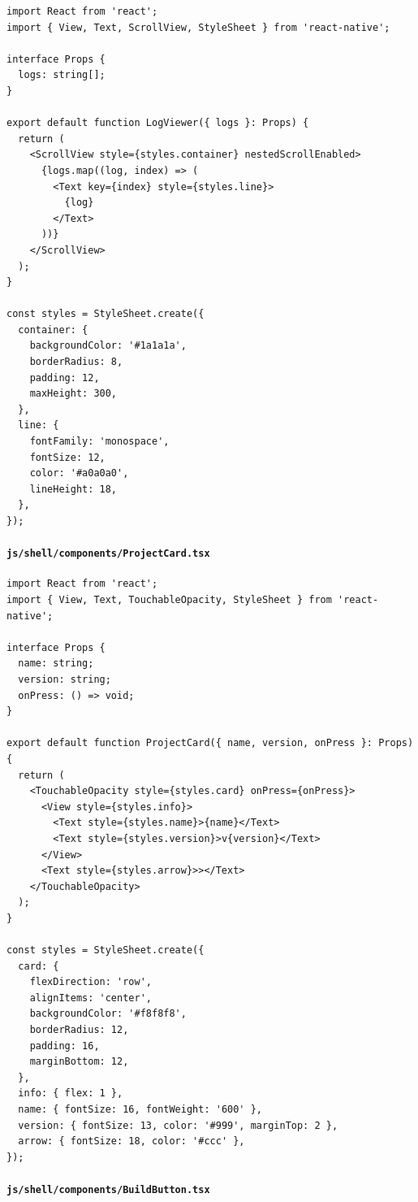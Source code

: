 \documentclass[11pt]{article}
\begin{document}
\begin{verbatim}
import React from 'react';
import { View, Text, ScrollView, StyleSheet } from 'react-native';

interface Props {
  logs: string[];
}

export default function LogViewer({ logs }: Props) {
  return (
    <ScrollView style={styles.container} nestedScrollEnabled>
      {logs.map((log, index) => (
        <Text key={index} style={styles.line}>
          {log}
        </Text>
      ))}
    </ScrollView>
  );
}

const styles = StyleSheet.create({
  container: {
    backgroundColor: '#1a1a1a',
    borderRadius: 8,
    padding: 12,
    maxHeight: 300,
  },
  line: {
    fontFamily: 'monospace',
    fontSize: 12,
    color: '#a0a0a0',
    lineHeight: 18,
  },
});
\end{verbatim}

\paragraph{\texttt{js/shell/components/ProjectCard.tsx}}

\begin{verbatim}
import React from 'react';
import { View, Text, TouchableOpacity, StyleSheet } from 'react-native';

interface Props {
  name: string;
  version: string;
  onPress: () => void;
}

export default function ProjectCard({ name, version, onPress }: Props) {
  return (
    <TouchableOpacity style={styles.card} onPress={onPress}>
      <View style={styles.info}>
        <Text style={styles.name}>{name}</Text>
        <Text style={styles.version}>v{version}</Text>
      </View>
      <Text style={styles.arrow}>></Text>
    </TouchableOpacity>
  );
}

const styles = StyleSheet.create({
  card: {
    flexDirection: 'row',
    alignItems: 'center',
    backgroundColor: '#f8f8f8',
    borderRadius: 12,
    padding: 16,
    marginBottom: 12,
  },
  info: { flex: 1 },
  name: { fontSize: 16, fontWeight: '600' },
  version: { fontSize: 13, color: '#999', marginTop: 2 },
  arrow: { fontSize: 18, color: '#ccc' },
});
\end{verbatim}

\paragraph{\texttt{js/shell/components/BuildButton.tsx}}
\end{document}

